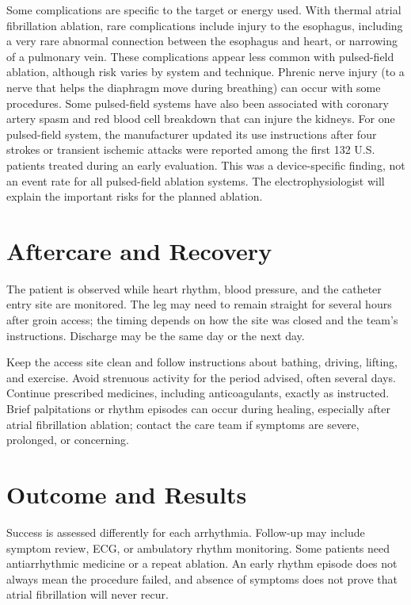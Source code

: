 Some complications are specific to the target or energy used. With thermal atrial fibrillation ablation, rare complications include injury to the esophagus, including a very rare abnormal connection between the esophagus and heart, or narrowing of a pulmonary vein. These complications appear less common with pulsed-field ablation, although risk varies by system and technique. Phrenic nerve injury (to a nerve that helps the diaphragm move during breathing) can occur with some procedures. Some pulsed-field systems have also been associated with coronary artery spasm and red blood cell breakdown that can injure the kidneys. For one pulsed-field system, the manufacturer updated its use instructions after four strokes or transient ischemic attacks were reported among the first 132 U.S. patients treated during an early evaluation. This was a device-specific finding, not an event rate for all pulsed-field ablation systems. The electrophysiologist will explain the important risks for the planned ablation.

\section*{Aftercare and Recovery}
The patient is observed while heart rhythm, blood pressure, and the catheter entry site are monitored. The leg may need to remain straight for several hours after groin access; the timing depends on how the site was closed and the team's instructions. Discharge may be the same day or the next day.

Keep the access site clean and follow instructions about bathing, driving, lifting, and exercise. Avoid strenuous activity for the period advised, often several days. Continue prescribed medicines, including anticoagulants, exactly as instructed. Brief palpitations or rhythm episodes can occur during healing, especially after atrial fibrillation ablation; contact the care team if symptoms are severe, prolonged, or concerning.

\section*{Outcome and Results}
Success is assessed differently for each arrhythmia. Follow-up may include symptom review, ECG, or ambulatory rhythm monitoring. Some patients need antiarrhythmic medicine or a repeat ablation. An early rhythm episode does not always mean the procedure failed, and absence of symptoms does not prove that atrial fibrillation will never recur.

